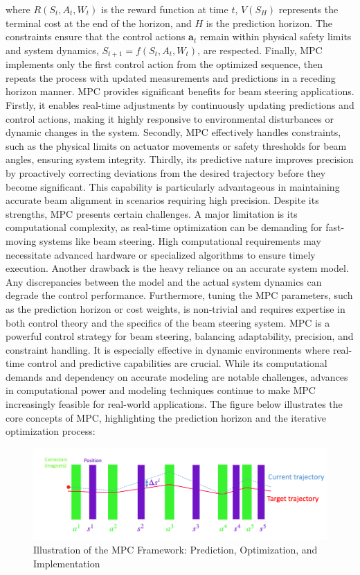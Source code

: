 \documentclass[journal,article,submit,pdftex,moreauthors]{Definitions/mdpi}
\begin{document}
where $R(S_t, A_t, W_t)$ is the reward function at time $t$, $V(S_H)$ represents the terminal cost at the end of the horizon, and $H$ is the prediction horizon. The constraints ensure that the control actions $\mathbf{a}_t$ remain within physical safety limits and system dynamics, $S_{t+1} = f(S_t, A_t, W_t)$, are respected. Finally, MPC implements only the first control action from the optimized sequence, then repeats the process with updated measurements and predictions in a receding horizon manner. MPC provides significant benefits for beam steering applications. Firstly, it enables real-time adjustments by continuously updating predictions and control actions, making it highly responsive to environmental disturbances or dynamic changes in the system. Secondly, MPC effectively handles constraints, such as the physical limits on actuator movements or safety thresholds for beam angles, ensuring system integrity. Thirdly, its predictive nature improves precision by proactively correcting deviations from the desired trajectory before they become significant. This capability is particularly advantageous in maintaining accurate beam alignment in scenarios requiring high precision. 
Despite its strengths, MPC presents certain challenges. A major limitation is its computational complexity, as real-time optimization can be demanding for fast-moving systems like beam steering. High computational requirements may necessitate advanced hardware or specialized algorithms to ensure timely execution. Another drawback is the heavy reliance on an accurate system model. Any discrepancies between the model and the actual system dynamics can degrade the control performance. Furthermore, tuning the MPC parameters, such as the prediction horizon or cost weights, is non-trivial and requires expertise in both control theory and the specifics of the beam steering system.
MPC is a powerful control strategy for beam steering, balancing adaptability, precision, and constraint handling. It is especially effective in dynamic environments where real-time control and predictive capabilities are crucial. While its computational demands and dependency on accurate modeling are notable challenges, advances in computational power and modeling techniques continue to make MPC increasingly feasible for real-world applications. The figure below illustrates the core concepts of MPC, highlighting the prediction horizon and the iterative optimization process:

\begin{figure}[h!]
	\centering
	\includegraphics[width=\textwidth]{Figures/AWAKE_steering_image.png}
	\caption{Illustration of the MPC Framework: Prediction, Optimization, and Implementation}
	\label{fig:MPC_diagram}
\end{figure}
\end{document}
